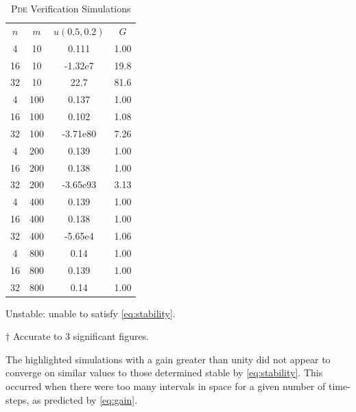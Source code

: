 \documentclass[a4paper,12pt,twocolumn]{article}
\begin{document}
\begin{table}[h]
    \centering
    \footnotesize
    \caption{\textsc{Pde} Verification Simulations}
    \label{table:pde}
    \begin{threeparttable}
        \begin{tabular}{
            @{\hspace{1em}}
            S[table-format=2]
            S[table-format=3]
            S[table-format=+2.2e2]
            S[table-format=2.2]
            @{\hspace{1em}}
        }
            \toprule
            {$n$} & {$m$} & {$u(0.5,0.2)$\tnote{$\dagger$}} & 
                {$G$\tnote{$\dagger$}}\\
            \cmidrule(rl){1-3}\cmidrule(rl){4-4}
             4 &  10 &  0.111   &  1.00 \\
            16 &  10 & -1.32e7  & 19.8  \\
            32 &  10 & 22.7     & 81.6  \\
             4 & 100 &  0.137   &  1.00 \\
            16 & 100 &  0.102   &  1.08 \\
            32 & 100 & -3.71e80 &  7.26 \\
             4 & 200 &  0.139   &  1.00 \\
            16 & 200 &  0.138   &  1.00 \\
            32 & 200 & -3.65e93 &  3.13 \\
             4 & 400 &  0.139   &  1.00 \\
            16 & 400 &  0.138   &  1.00 \\
            32 & 400 & -5.65e4  &  1.06 \\
             4 & 800 &  0.14    &  1.00 \\
            16 & 800 &  0.139   &  1.00 \\
            32 & 800 &  0.14    &  1.00 \\
            \bottomrule
        \end{tabular}
        \begin{tablenotes}
            \item\colorbox{red!20}{Unstable: unable to satisfy
                \eqref{eq:stability}.}
            \item[$\dagger$] Accurate to 3 significant figures.
        \end{tablenotes}
    \end{threeparttable}
\end{table}

The highlighted simulations with a gain greater than unity did not appear to
converge on similar values to those determined stable by \eqref{eq:stability}.
This occurred when there were too many intervals in space for a given number of
time-steps, as predicted by \eqref{eq:gain}.

\printbibliography
\end{document}
